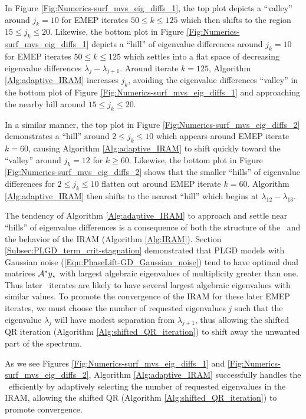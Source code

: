 \begin{enumerate}
In Figure \ref{Fig:Numerics-surf_mvs_eig_diffs_1}, the top plot depicts a ``valley'' around $j_k = 10$ for EMEP iterates $50 \leq k  \leq 125$ which then shifts to the region $15 \leq j_k \leq 20$.
Likewise, the bottom plot in Figure \ref{Fig:Numerics-surf_mvs_eig_diffs_1} depicts a ``hill'' of eigenvalue differences around $j_k = 10$ for EMEP iterates $50 \leq k  \leq 125$ which settles into a flat space of decreasing eigenvalue differences $\lambda_{j} - \lambda_{j+1}$.  
Around iterate $k = 125$, Algorithm \ref{Alg:adaptive_IRAM} increases $j_k$, avoiding the eigenvalue differences ``valley'' in the bottom plot of Figure \ref{Fig:Numerics-surf_mvs_eig_diffs_1} and approaching the nearby hill around $15 \leq j_k \leq 20$.


In a similar manner, the top plot in Figure \ref{Fig:Numerics-surf_mvs_eig_diffs_2} demonstrates a ``hill'' around $2 \leq j_k  \leq 10$ which appears around EMEP iterate $k = 60$, causing Algorithm \ref{Alg:adaptive_IRAM} to shift quickly toward the ``valley'' around $j_k = 12$ for $k \geq 60$.
Likewise, the bottom plot in Figure \ref{Fig:Numerics-surf_mvs_eig_diffs_2} shows that the smaller ``hills'' of eigenvalue differences for $2 \leq j_k  \leq 10$ flatten out around EMEP iterate $k = 60$.   Algorithm \ref{Alg:adaptive_IRAM} then shifts to the nearest ``hill'' which begins at $\lambda_{12} - \lambda_{13}$.



The tendency of Algorithm \ref{Alg:adaptive_IRAM} to approach and settle near ``hills'' of eigenvalue differences is a consequence of both the structure of the \emep \ and the behavior of the IRAM (Algorithm \ref{Alg:IRAM}).
Section \ref{Subsec:PLGD_term_crit-stagnation} demonstrated that PLGD models with Gaussian noise (\ref{Eqn:PhaseLift-GD_Gaussian_noise}) tend to have optimal dual matrices ${\mathcal A}^*y_\star$ with largest algebraic eigenvalues of multiplicity greater than one.  Thus later \emep \ iterates are likely to have several largest algebraic eigenvalues with similar values.
To promote the convergence of the IRAM for these later EMEP iterates, we must choose the number of requested eigenvalues $j$ such that the eigenvalue $\lambda_j$ will have modest separation from $\lambda_{j+1}$, thus allowing the shifted QR iteration (Algorithm \ref{Alg:shifted_QR_iteration}) to shift away the unwanted part of the spectrum.


As we see Figures \ref{Fig:Numerics-surf_mvs_eig_diffs_1} and \ref{Fig:Numerics-surf_mvs_eig_diffs_2}, Algorithm \ref{Alg:adaptive_IRAM} successfully handles the \emep \ efficiently by adaptively selecting the number of requested eigenvalues in the IRAM, allowing the shifted QR (Algorithm \ref{Alg:shifted_QR_iteration}) to promote convergence.



\end{enumerate}
